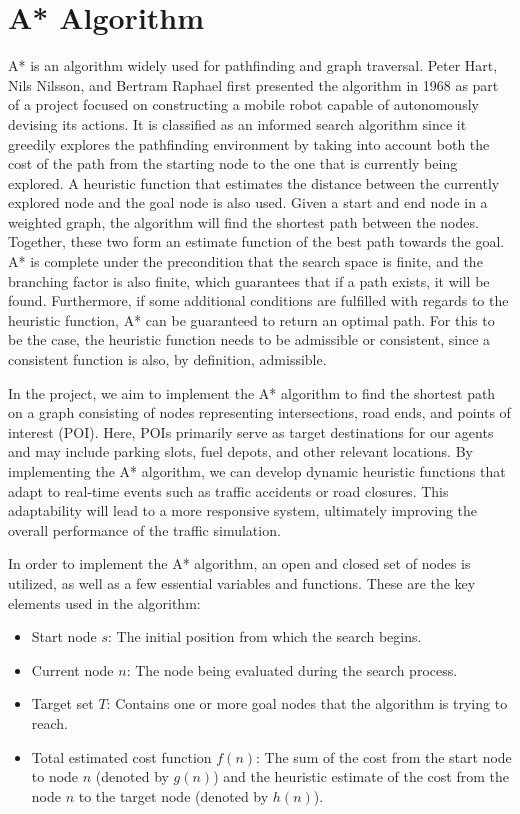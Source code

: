 \section{A* Algorithm}
    A* is an algorithm widely used for pathfinding and graph traversal. Peter Hart, Nils Nilsson, and Bertram Raphael first presented the algorithm in 1968\cite{hart1968formal} as part of a project focused on constructing a mobile robot capable of autonomously devising its actions. It is classified as an informed search algorithm since it greedily explores the pathfinding environment by taking into account both the cost of the path from the starting node to the one that is currently being explored. A heuristic function that estimates the distance between the currently explored node and the goal node is also used\cite{russell2016artificial}. Given a start and end node in a weighted graph, the algorithm will find the shortest path between the nodes. Together, these two form an estimate function of the best path towards the goal. A* is complete under the precondition that the search space is finite, and the branching factor is also finite, which guarantees that if a path exists, it will be found. Furthermore, if some additional conditions are fulfilled with regards to the heuristic function, A* can be guaranteed to return an optimal path. For this to be the case, the heuristic function needs to be admissible or consistent, since a consistent function is also, by definition, admissible\cite{dechter1985generalized}.

In the project, we aim to implement the A* algorithm to find the shortest path on a graph consisting of nodes representing intersections, road ends, and points of interest (POI). Here, POIs primarily serve as target destinations for our agents and may include parking slots, fuel depots, and other relevant locations. By implementing the A* algorithm, we can develop dynamic heuristic functions that adapt to real-time events such as traffic accidents or road closures. This adaptability will lead to a more responsive system, ultimately improving the overall performance of the traffic simulation. 
    
    In order to implement the A* algorithm, an open and closed set of nodes is utilized, as well as a few essential variables and functions. These are the key elements used in the algorithm:

    \begin{itemize}
        \item Start node $s$: The initial position from which the search begins.
        \item Current node $n$: The node being evaluated during the search process.
        \item Target set $T$: Contains one or more goal nodes that the algorithm is trying to reach.
        \item Total estimated cost function $f(n)$: The sum of the cost from the start node to node $n$ (denoted by $g(n)$) and the heuristic estimate of the cost from the node $n$ to the target node (denoted by $h(n)$).
    \end{itemize}

